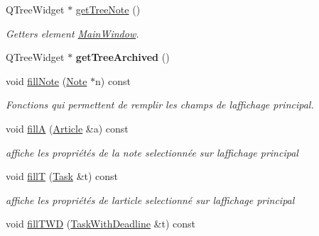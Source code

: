 \begin{DoxyCompactItemize}
\mbox{\label{classMainWindow_aa701a7e0cd234d2529d1bb756571b390}} 
Q\+Tree\+Widget $\ast$ \hyperlink{classMainWindow_aa701a7e0cd234d2529d1bb756571b390}{get\+Tree\+Note} ()
\begin{DoxyCompactList}\small\item\em Getters element \hyperlink{classMainWindow}{Main\+Window}. \end{DoxyCompactList}\item 
\mbox{\label{classMainWindow_ad0e00a6772299d12797d2d13d7e9ab98}} 
Q\+Tree\+Widget $\ast$ {\bfseries get\+Tree\+Archived} ()
\item 
\mbox{\label{classMainWindow_a6440bda1786c5ee51cf9c43e3a29b0e7}} 
void \hyperlink{classMainWindow_a6440bda1786c5ee51cf9c43e3a29b0e7}{fill\+Note} (\hyperlink{classNote}{Note} $\ast$n) const
\begin{DoxyCompactList}\small\item\em Fonctions qui permettent de remplir les champs de l\textquotesingle{}affichage principal. \end{DoxyCompactList}\item 
\mbox{\label{classMainWindow_a1f5cc352fe49759eee6fdba0ed59c4c4}} 
void \hyperlink{classMainWindow_a1f5cc352fe49759eee6fdba0ed59c4c4}{fillA} (\hyperlink{classArticle}{Article} \&a) const
\begin{DoxyCompactList}\small\item\em affiche les propriétés de la note selectionnée sur l\textquotesingle{}affichage principal \end{DoxyCompactList}\item 
\mbox{\label{classMainWindow_a84a0509ab8740884a3f95b3c11e634a8}} 
void \hyperlink{classMainWindow_a84a0509ab8740884a3f95b3c11e634a8}{fillT} (\hyperlink{classTask}{Task} \&t) const
\begin{DoxyCompactList}\small\item\em affiche les propriétés de l\textquotesingle{}article selectionné sur l\textquotesingle{}affichage principal \end{DoxyCompactList}\item 
\mbox{\label{classMainWindow_ab18ce7466299d0ba82bf82963e2efa52}} 
void \hyperlink{classMainWindow_ab18ce7466299d0ba82bf82963e2efa52}{fill\+T\+WD} (\hyperlink{classTaskWithDeadline}{Task\+With\+Deadline} \&t) const

\end{DoxyCompactItemize}
